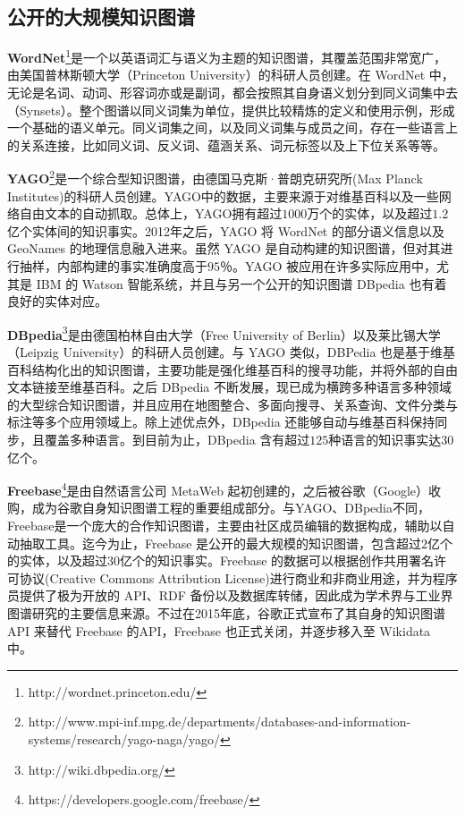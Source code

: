\subsection{公开的大规模知识图谱}

	\textbf{WordNet}\footnote{http://wordnet.princeton.edu/}是一个以英语词汇与语义为主题的知识图谱，其覆盖范围非常宽广，由美国普林斯顿大学（Princeton University）的科研人员创建。在 WordNet 中，无论是名词、动词、形容词亦或是副词，都会按照其自身语义划分到同义词集中去（Synsets）。整个图谱以同义词集为单位，提供比较精炼的定义和使用示例，形成一个基础的语义单元。同义词集之间，以及同义词集与成员之间，存在一些语言上的关系连接，比如同义词、反义词、蕴涵关系、词元标签以及上下位关系等等。

	\textbf{YAGO}\footnote{http://www.mpi-inf.mpg.de/departments/databases-and-information-systems/research/yago-naga/yago/}是一个综合型知识图谱，由德国马克斯·普朗克研究所(Max Planck Institutes)的科研人员创建。YAGO中的数据，主要来源于对维基百科以及一些网络自由文本的自动抓取。总体上，YAGO拥有超过$1000$万个的实体，以及超过$1.2$亿个实体间的知识事实。2012年之后，YAGO 将 WordNet 的部分语义信息以及 GeoNames 的地理信息融入进来。虽然 YAGO 是自动构建的知识图谱，但对其进行抽样，内部构建的事实准确度高于$95$％。YAGO 被应用在许多实际应用中，尤其是 IBM 的 Watson 智能系统，并且与另一个公开的知识图谱 DBpedia 也有着良好的实体对应。

	\textbf{DBpedia}\footnote{http://wiki.dbpedia.org/}是由德国柏林自由大学（Free University of Berlin）以及莱比锡大学（Leipzig University）的科研人员创建。与 YAGO 类似，DBPedia 也是基于维基百科结构化出的知识图谱，主要功能是强化维基百科的搜寻功能，并将外部的自由文本链接至维基百科。之后 DBpedia 不断发展，现已成为横跨多种语言多种领域的大型综合知识图谱，并且应用在地图整合、多面向搜寻、关系查询、文件分类与标注等多个应用领域上。除上述优点外，DBpedia 还能够自动与维基百科保持同步，且覆盖多种语言。到目前为止，DBpedia 含有超过$125$种语言的知识事实达$30$亿个。

	\textbf{Freebase}\footnote{https://developers.google.com/freebase/}是由自然语言公司 MetaWeb 起初创建的，之后被谷歌（Google）收购，成为谷歌自身知识图谱工程的重要组成部分。与YAGO、DBpedia不同，Freebase是一个庞大的合作知识图谱，主要由社区成员编辑的数据构成，辅助以自动抽取工具。迄今为止，Freebase 是公开的最大规模的知识图谱，包含超过$2$亿个的实体，以及超过$30$亿个的知识事实。Freebase 的数据可以根据创作共用署名许可协议(Creative Commons Attribution License)进行商业和非商业用途，并为程序员提供了极为开放的 API、RDF 备份以及数据库转储，因此成为学术界与工业界图谱研究的主要信息来源。不过在2015年底，谷歌正式宣布了其自身的知识图谱 API 来替代 Freebase 的API，Freebase 也正式关闭，并逐步移入至 Wikidata 中。

